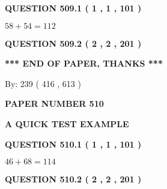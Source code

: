 \documentclass[12pt]{article}
\begin{document}
   
  
\vspace{0.2in}
  
{\textbf{\Large{QUESTION
509.1 
 ( 1 , 1 , 101 )
}}}
  
  
 
 

$ %
58 +  %
54=   %
112$
 
 
  
\vspace{0.2in}
  
{\textbf{\Large{QUESTION
509.2 
 ( 2 , 2 , 201 )
}}}
  
  
   
   
 \vspace{0.2in}
 
   
   
   
   
\vspace{1.0in} 
{\textbf{\large{ *** END OF PAPER, THANKS *** }}} 
   
   
\hspace{1.0in} By: 
 239 ( 416 ,  613 )
   
   
   
   
\newpage 
\setcounter{page}{ 
   510001 } 
   
   
   
   
 {\textbf{ \Large{ PAPER NUMBER  510  }}}
   
   
\vspace{0.2in}
   
   
   
   
   
   
 \vspace{0.2in}
{\LARGE {\textbf{ A QUICK TEST EXAMPLE}}}
   
   
  
\vspace{0.2in}
  
{\textbf{\Large{QUESTION
510.1 
 ( 1 , 1 , 101 )
}}}
  
  
 
 

$ %
46 +  %
68=   %
114$
 
 
  
\vspace{0.2in}
  
{\textbf{\Large{QUESTION
510.2 
 ( 2 , 2 , 201 )
}}}
  
  
   
\end{document}
